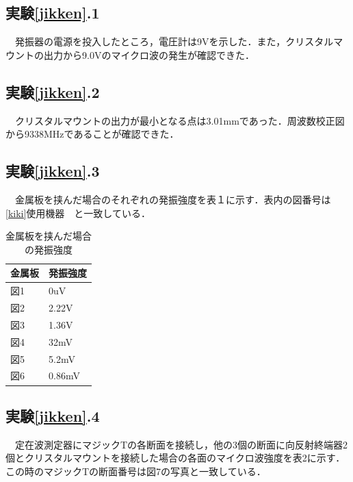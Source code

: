 \subsection{実験\ref{jikken}.1}
　発振器の電源を投入したところ，電圧計は9Vを示した．また，クリスタルマウントの出力から9.0Vのマイクロ波の発生が確認できた．

\subsection{実験\ref{jikken}.2}
　クリスタルマウントの出力が最小となる点は3.01mmであった．周波数校正図から9338MHzであることが確認できた．

\subsection{実験\ref{jikken}.3}
　金属板を挟んだ場合のそれぞれの発振強度を表１に示す．表内の図番号は　\ref{kiki}使用機器　と一致している．

  \begin{table}[H]
    \caption{金属板を挟んだ場合の発振強度}
    \centering
      \begin{tabular}{|l|l|}
      \hline
      金属板 & 発振強度   \\ \hline
      図1  & 0uV    \\ \hline
      図2  & 2.22V  \\ \hline
      図3  & 1.36V  \\ \hline
      図4  & 32mV   \\ \hline
      図5  & 5.2mV  \\ \hline
      図6  & 0.86mV \\ \hline
    \end{tabular}
  \end{table}

  \subsection{実験\ref{jikken}.4}
  　定在波測定器にマジックTの各断面を接続し，他の3個の断面に向反射終端器2個とクリスタルマウントを接続した場合の各面のマイクロ波強度を表2に示す．この時のマジックTの断面番号は図7の写真と一致している．

